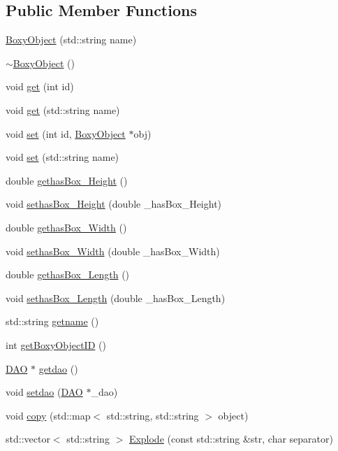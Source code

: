 \subsection*{Public Member Functions}
\begin{DoxyCompactItemize}
\item 
\hyperlink{class_boxy_object_ac34b3a3838b64fdcc5d2d02c4a6bcca6}{BoxyObject} (std::string name)
\item 
\hyperlink{class_boxy_object_a93fa80f07bf6491f3a4da109fe2a2dcb}{$\sim$BoxyObject} ()
\item 
void \hyperlink{class_boxy_object_a7fdbe551740154b9be17cca9e17b5cd0}{get} (int id)
\item 
void \hyperlink{class_boxy_object_aaa4e45e5c3f830a1c0e942a8dc56e913}{get} (std::string name)
\item 
void \hyperlink{class_boxy_object_a4d1aa934a51159726e888efed2379b15}{set} (int id, \hyperlink{class_boxy_object}{BoxyObject} $\ast$obj)
\item 
void \hyperlink{class_boxy_object_a7974464a1468ea0513119cf5f843c763}{set} (std::string name)
\item 
double \hyperlink{class_boxy_object_a6aeed193c079ae3b95b3f067b7039720}{gethasBox\_\-Height} ()
\item 
void \hyperlink{class_boxy_object_a4420d3dc9e3707fe6c3079edf8b43d65}{sethasBox\_\-Height} (double \_\-hasBox\_\-Height)
\item 
double \hyperlink{class_boxy_object_a860ad5cd9341bf8d40e0a367163ef15e}{gethasBox\_\-Width} ()
\item 
void \hyperlink{class_boxy_object_aa2fe1afa5d4f23d1e0fa35e9dde920d5}{sethasBox\_\-Width} (double \_\-hasBox\_\-Width)
\item 
double \hyperlink{class_boxy_object_aad90d5fc459acfb266c1aafaa14eae92}{gethasBox\_\-Length} ()
\item 
void \hyperlink{class_boxy_object_a39abf466eb4290fc890cc6f5f4df1166}{sethasBox\_\-Length} (double \_\-hasBox\_\-Length)
\item 
std::string \hyperlink{class_boxy_object_ac088bb2ceeafc1dfa6bd008bd5a6b202}{getname} ()
\item 
int \hyperlink{class_boxy_object_ac344424a0ae9fa132924575e6b01068b}{getBoxyObjectID} ()
\item 
\hyperlink{class_d_a_o}{DAO} $\ast$ \hyperlink{class_boxy_object_ab2cd5b94e2c5256f7d2c568299bbd4e3}{getdao} ()
\item 
void \hyperlink{class_boxy_object_a1031d3686be59ed04b4d8d8bd9fd3681}{setdao} (\hyperlink{class_d_a_o}{DAO} $\ast$\_\-dao)
\item 
void \hyperlink{class_boxy_object_a3ad370f98134160310755471107c1ca0}{copy} (std::map$<$ std::string, std::string $>$ object)
\item 
std::vector$<$ std::string $>$ \hyperlink{class_boxy_object_a1d37849e12f62be2d43d72a6f9a2f3b6}{Explode} (const std::string \&str, char separator)
\end{DoxyCompactItemize}


